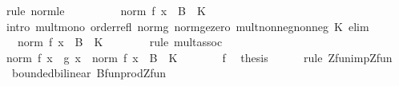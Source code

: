 \begin{isabellebody}
\ {\isacharparenleft}{\kern0pt}rule\ norm{\isacharunderscore}{\kern0pt}le{\isacharparenright}{\kern0pt}\isanewline
\ \ \ \ \isamarkupfalse%
\ \isamarkupfalse%
\ {\isachardoublequoteopen}{\isasymdots}\ {\isasymle}\ norm\ {\isacharparenleft}{\kern0pt}f\ x{\isacharparenright}{\kern0pt}\ {\isacharasterisk}{\kern0pt}\ B\ {\isacharasterisk}{\kern0pt}\ K{\isachardoublequoteclose}\isanewline
\ \ \ \ \ \ \isamarkupfalse%
\ {\isacharparenleft}{\kern0pt}intro\ mult{\isacharunderscore}{\kern0pt}mono{\isacharprime}{\kern0pt}\ order{\isacharunderscore}{\kern0pt}refl\ norm{\isacharunderscore}{\kern0pt}g\ norm{\isacharunderscore}{\kern0pt}ge{\isacharunderscore}{\kern0pt}zero\ mult{\isacharunderscore}{\kern0pt}nonneg{\isacharunderscore}{\kern0pt}nonneg\ K\ elim{\isacharparenright}{\kern0pt}\isanewline
\ \ \ \ \isamarkupfalse%
\ \isamarkupfalse%
\ {\isachardoublequoteopen}{\isasymdots}\ {\isacharequal}{\kern0pt}\ norm\ {\isacharparenleft}{\kern0pt}f\ x{\isacharparenright}{\kern0pt}\ {\isacharasterisk}{\kern0pt}\ {\isacharparenleft}{\kern0pt}B\ {\isacharasterisk}{\kern0pt}\ K{\isacharparenright}{\kern0pt}{\isachardoublequoteclose}\isanewline
\ \ \ \ \ \ \isamarkupfalse%
\ {\isacharparenleft}{\kern0pt}rule\ mult{\isachardot}{\kern0pt}assoc{\isacharparenright}{\kern0pt}\isanewline
\ \ \ \ \isamarkupfalse%
\ \isamarkupfalse%
\ {\isachardoublequoteopen}norm\ {\isacharparenleft}{\kern0pt}f\ x\ {\isacharasterisk}{\kern0pt}{\isacharasterisk}{\kern0pt}\ g\ x{\isacharparenright}{\kern0pt}\ {\isasymle}\ norm\ {\isacharparenleft}{\kern0pt}f\ x{\isacharparenright}{\kern0pt}\ {\isacharasterisk}{\kern0pt}\ {\isacharparenleft}{\kern0pt}B\ {\isacharasterisk}{\kern0pt}\ K{\isacharparenright}{\kern0pt}{\isachardoublequoteclose}\ \isacommand{{\isachardot}{\kern0pt}}\isamarkupfalse%
\isanewline
\ \ \isamarkupfalse%
\isanewline
\ \ \isamarkupfalse%
\ f\ \isamarkupfalse%
\ {\isacharquery}{\kern0pt}thesis\isanewline
\ \ \ \ \isamarkupfalse%
\ {\isacharparenleft}{\kern0pt}rule\ Zfun{\isacharunderscore}{\kern0pt}imp{\isacharunderscore}{\kern0pt}Zfun{\isacharparenright}{\kern0pt}\isanewline
{}\isamarkupfalse%
%
\endisatagproof
{\isafoldproof}%
%
\isadelimproof
\isanewline
%
\endisadelimproof
\isanewline
{}\isamarkupfalse%
\ {\isacharparenleft}{\kern0pt}\ bounded{\isacharunderscore}{\kern0pt}bilinear{\isacharparenright}{\kern0pt}\ Bfun{\isacharunderscore}{\kern0pt}prod{\isacharunderscore}{\kern0pt}Zfun{\isacharcolon}{\kern0pt}\isanewline

\end{isabellebody}
